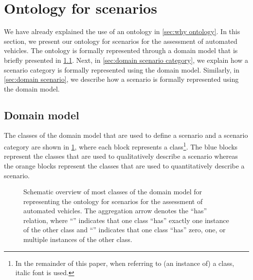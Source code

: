 \section{Ontology for scenarios}
\label{sec:ontology}

We have already explained the use of an ontology in \cref{sec:why ontology}. In this section, we present our ontology for scenarios for the assessment of automated vehicles. 
The ontology is formally represented through a domain model that is briefly presented in \cref{sec:domain model}. Next, in \cref{sec:domain scenario category}, we explain how a scenario category is formally represented using the domain model. Similarly, in \cref{sec:domain scenario}, we describe how a scenario is formally represented using the domain model. 



\subsection{Domain model}
\label{sec:domain model}

The classes of the domain model that are used to define a scenario and a scenario category are shown in \cref{fig:ontology classes}, where each block represents a class\cbstartd\footnote{\cbstartd In the remainder of this paper, when referring to (an instance of) a class, italic font is used.\cbend}\cbend.
The blue blocks represent the classes that are used to qualitatively describe a scenario whereas the orange blocks represent the classes that are used to quantitatively describe a scenario. 

\begin{figure}
	\centering
	
	\caption{\cbstart Schematic overview of most classes of the domain model for representing the ontology for scenarios for the assessment of automated vehicles. The aggregation arrow denotes the ``has'' relation, where ``\hasone'' indicates that one class ``has'' exactly one instance of the other class and ``\hasn'' indicates that one class ``has'' zero, one, or multiple instances of the other class.\cbend}
	\label{fig:ontology classes}
\end{figure}

